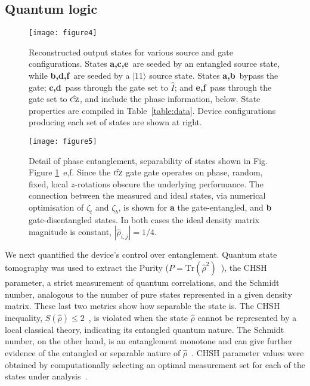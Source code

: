 \documentclass[
twocolumn,
 amsmath,amssymb,
 aps,
  twoside,
 superscriptaddress,
pra,
longbibliography
]{revtex4-1}
\begin{document}
\subsection*{Quantum logic}




\begin{figure}[h!]
\centering
\texttt{[image: figure4]}
\caption{Reconstructed output states for various source and gate configurations. States \textbf{a,c,e}~are seeded by an entangled source state, while \textbf{b,d,f}~are seeded by a $|11\rangle$ source state. States \textbf{a,b}~bypass the gate; \textbf{c,d}~pass through the gate set to $\hat{I}$; and \textbf{e,f}~pass through the gate set to $\hat{\textsc{cz}}$, and include the phase information, below. State properties are compiled in Table~\ref{table:data}. Device configurations producing each set of states are shown at right.}\label{figure4}
\end{figure}

\begin{figure}[h!]
\centering
\texttt{[image: figure5]}
\caption{Detail of phase entanglement, separability of states shown in Fig. Figure \ref{figure4}~e,f. Since the $\hat{\textsc{cz}}$ gate gate operates on phase, random, fixed, local $z$-rotations obscure the underlying performance. The connection between the measured and ideal states, via numerical optimisation of $\zeta_t$ and $\zeta_b$, is shown for \textbf{a} the gate-entangled, and \textbf{b} gate-disentangled states. In both cases the ideal density matrix magnitude is constant, $|\hat\rho_{i,j}| = 1/4$.}\label{figure5}
\end{figure}



We next quantified the device's control over entanglement. Quantum state tomography was used to extract the Purity ($P=\mathrm{Tr}(\hat\rho^2)$~\cite{Gamel:2012hm}), the CHSH parameter, a strict measurement of quantum correlations, and the Schmidt number, analogous to the number of pure states represented in a given density matrix. These last two metrics show how separable the state is. The CHSH inequality, $S(\hat\rho) \le 2$~\cite{Aspect:1982br, Horodecki:2009gb, Silverstone2015}, 
is violated when the state $\hat\rho$ cannot be represented by a local classical theory, indicating its entangled quantum nature. The Schmidt number, on the other hand, is an entanglement monotone and can give further evidence of the entangled or separable nature of $\hat\rho$~\cite{Terhal:2000gd, Horodecki:2009gb, Sperling:2011di}. CHSH parameter values were obtained by computationally selecting an optimal measurement set for each of the states under analysis~\cite{Silverstone2015}.
\end{document}
